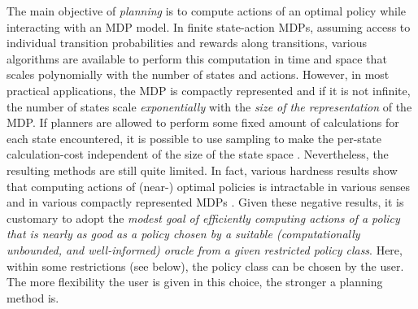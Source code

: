 The main objective of \emph{planning} is to compute actions of an optimal policy while interacting with an MDP model. 
In finite state-action MDPs,
assuming access to individual transition probabilities and rewards along transitions, 
various algorithms are available to perform this computation in time and space that scales polynomially with the number of states and actions.
However, in most practical applications, the MDP is compactly represented
and if it is not infinite, the number of states scale \emph{exponentially} with the \emph{size of the representation} of the MDP.
If planners are allowed to perform some fixed amount of calculations for each state encountered,
it is possible to use sampling to make the per-state calculation-cost 
independent of the size of the state space \cite{rust96:randomization,szepesvari2001,kearns2002sparse}.
Nevertheless, the resulting methods are still quite limited. 
In fact, various hardness results show that computing actions of (near-) optimal policies is intractable in various senses
and in various compactly represented MDPs \cite{BlonTsi:00Complexity}.
Given these negative results, 
it is customary to adopt the \emph{modest goal of efficiently computing actions of a policy that 
is nearly as good as a policy chosen by a suitable (computationally unbounded, and well-informed) oracle
from a given restricted policy class}. 
Here, within some restrictions (see below), the policy class can be chosen by the user.
The more flexibility the user is given in this choice, the stronger a planning method is. 

